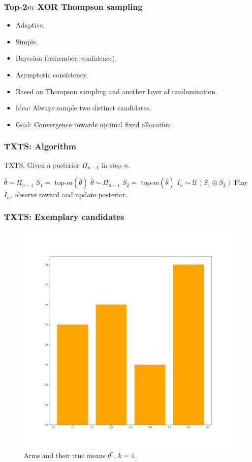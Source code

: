 \documentclass[aspectratio=43]{beamer}
\begin{document}
\begin{frame}
\frametitle{Top-2$m$ XOR Thompson sampling}
\begin{itemize}[<+->]
  \item Adaptive.
  \item Simple.
  \item Bayesian (remember: confidence).
  \item Asymptotic consistency.
  \item Based on Thompson sampling and another layer of randomization.
  \item Idea: Always sample two distinct candidates.
  \item Goal: Convergence towards optimal fixed allocation.
\end{itemize}
\end{frame}

\begin{frame}
\frametitle{TXTS: Algorithm}
\begin{algorithm}[H]
  \caption{TXTS: Given a posterior $\Pi_{n-1}$ in step $n$.}
  \label{alg:TXTS}
  \begin{algorithmic}
    \State $\hat{\theta} \sim \Pi_{n-1}$
    \State $S_1 =$ top-$m(\hat{\theta})$
    \Repeat
      \State $\hat{\theta} \sim \Pi_{n-1}$
      \State $S_2 = $ top-$m(\hat{\theta})$
    \State $I_n \sim \mathcal{U}(S_1 \oplus S_2)$
    \State Play $I_n$, observe reward and update posterior.
  \end{algorithmic}
\end{algorithm}
\end{frame}

\begin{frame}
  \frametitle{TXTS: Exemplary candidates}
  \begin{figure}[h]
    \centering
    \includegraphics[width=.5\textwidth]{191127-bandits_1.png}
    \caption{Arms and their true means $\theta^*$. $k=4$.}
  \end{figure}
\end{frame}
\end{document}
